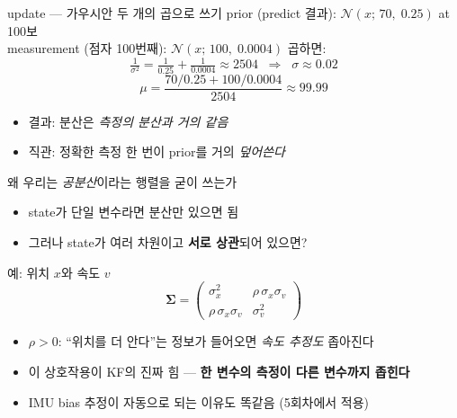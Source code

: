 \begin{frame}{update — 가우시안 두 개의 곱으로 쓰기}
  \footnotesize
  prior (predict 결과): $\mathcal{N}(x;\, 70,\; 0.25)$ at 100보\\
  measurement (점자 100번째): $\mathcal{N}(x;\, 100,\; 0.0004)$
  \pause
  \vspace{0.3em}
  곱하면:
  \[
    \tfrac{1}{\sigma^2} = \tfrac{1}{0.25}+\tfrac{1}{0.0004} \approx 2504
    \;\;\Rightarrow\;\; \sigma \approx 0.02
  \]
  \[
    \mu = \frac{70/0.25 + 100/0.0004}{2504} \approx 99.99
  \]
  \begin{itemize}
    \item 결과: 분산은 \emph{측정의 분산과 거의 같음}
    \item 직관: 정확한 측정 한 번이 prior를 거의 \emph{덮어쓴다}
  \end{itemize}
\end{frame}

\begin{frame}{왜 우리는 \emph{공분산}이라는 행렬을 굳이 쓰는가}
  \footnotesize
  \begin{itemize}
    \item state가 단일 변수라면 분산만 있으면 됨
    \item 그러나 state가 여러 차원이고 \textbf{서로 상관}되어 있으면?
  \end{itemize}
  \pause
  \vspace{0.3em}
  예: 위치 $x$와 속도 $v$
  \[
    \bm{\Sigma} = \begin{pmatrix} \sigma_x^2 & \rho\,\sigma_x\sigma_v \\
                                   \rho\,\sigma_x\sigma_v & \sigma_v^2 \end{pmatrix}
  \]
  \begin{itemize}
    \item $\rho > 0$: ``위치를 더 안다''는 정보가 들어오면 \emph{속도 추정도} 좁아진다
    \item 이 상호작용이 KF의 진짜 힘 — \textbf{한 변수의 측정이 다른 변수까지 좁힌다}
    \item IMU bias 추정이 자동으로 되는 이유도 똑같음 (5회차에서 적용)
  \end{itemize}
\end{frame}

